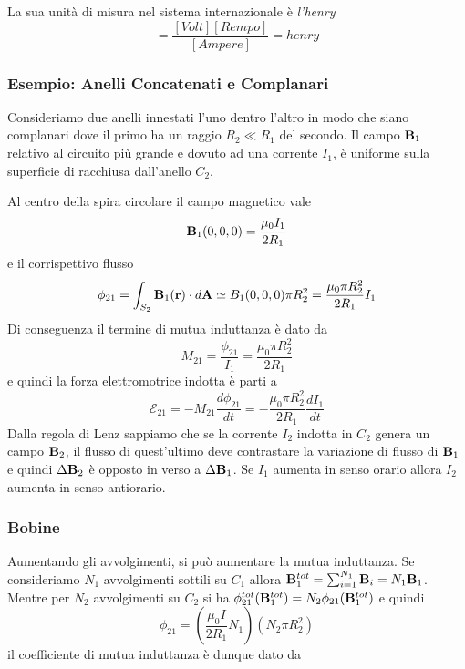 La sua unit\`a di misura nel sistema internazionale \`e \textit{l'henry}
\begin{equation*}
	[M] = \frac{[Volt][Rempo]}{[Ampere]} = henry
\end{equation*}

\subsubsection{Esempio: Anelli Concatenati e Complanari}

Consideriamo due anelli innestati l'uno dentro l'altro in modo che siano complanari dove il primo ha un raggio $R_2 \ll R_1$ del secondo. Il campo $\bold{B}_1$ relativo al circuito pi\`u grande e dovuto ad una corrente $I_1$, \`e uniforme sulla superficie di racchiusa dall'anello $C_2$.

Al centro della spira circolare il campo magnetico vale 
\begin{equation*}
	\bold{B}_1(0,0,0) = \frac{\mu_0 I_1 }{2 R_1}
\end{equation*}
e il corrispettivo flusso 
\begin{equation*}
	\phi_{21} = \int_{S_2} \bold{B}_1(\bold{r}) \cdot d\bold{A} \simeq B_{1}(0,0,0)\pi R_2^2 = \frac{\mu_0 \pi R_2^2}{2 R_1}I_1
\end{equation*}
Di conseguenza il termine di mutua induttanza \`e dato da 
\begin{equation*}
	M_{21} = \frac{\phi_{21}}{I_{1}} = \frac{\mu_0 \pi R_2^2}{2 R_1}
\end{equation*}
e quindi la forza elettromotrice indotta \`e parti a 
\begin{equation*}
	\mathcal{E}_{21} = - M_{21} \frac{d\phi_{21}}{dt} = -\frac{\mu_0 \pi R_2^2}{2R_1}\frac{dI_1}{dt}
\end{equation*}
Dalla regola di Lenz  sappiamo che se la corrente $I_2$ indotta in $C_2$ genera un campo $\bold{B}_2$, il flusso di quest'ultimo deve contrastare la variazione di flusso di $\bold{B}_1$ e quindi $\Delta \bold{B}_{2}$ \`e opposto in verso a $\Delta \bold{B}_1$. Se $I_1$ aumenta in senso orario allora $I_2$ aumenta in senso antiorario.

\subsubsection{Bobine}
Aumentando gli avvolgimenti, si pu\`o aumentare la mutua induttanza. Se consideriamo $N_1$ avvolgimenti sottili su $C_1$ allora $\bold{B}_{1}^{tot} = \sum_{i=1}^{N_1}\bold{B}_i = N_1 \bold{B}_{1}$. Mentre per $N_2$ avvolgimenti su $C_2$ si ha $\phi_{21}^{tot}(\bold{B}_1^{tot}) = N_2 \phi_{21}(\bold{B}_1^{tot})$ e quindi 
\begin{equation*}
	\phi_{21} = \left( \frac{\mu_0 I}{2R_1}N_1 \right)\left(N_2 \pi R_2^2\right)
\end{equation*}
il coefficiente di mutua induttanza \`e dunque dato da 

